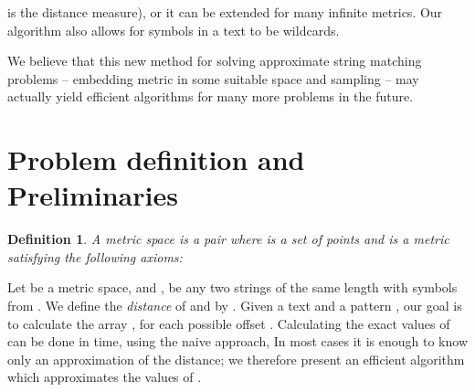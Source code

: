 \documentclass[11pt]{article}
\newtheorem{dfn}[thm]{Definition}
\begin{document}
is the distance measure), or it can be extended for many infinite
metrics. Our algorithm also allows for symbols in a text to be
wildcards.


We believe that this new method for solving approximate string matching
problems -- embedding metric in some suitable space and sampling
-- may actually yield efficient algorithms for many more problems in the future.























\section{Problem definition and Preliminaries }\label{s:def}
\begin{dfn} A {metric space}
 is a pair  where  is a set of points and  is a {\em metric} satisfying the
following axioms:

\end{dfn}
Let  be a metric space, and  , be any two strings of the same
length with symbols from . We define the \emph{distance}
of  and  by .
Given a text  and a pattern , our goal is to calculate the array , for each possible offset . Calculating the exact values of  can be done in 
time, using the naive approach, In most cases it is enough to know
only an approximation of the distance; we therefore present an
efficient algorithm which approximates the values of .
\end{document}
